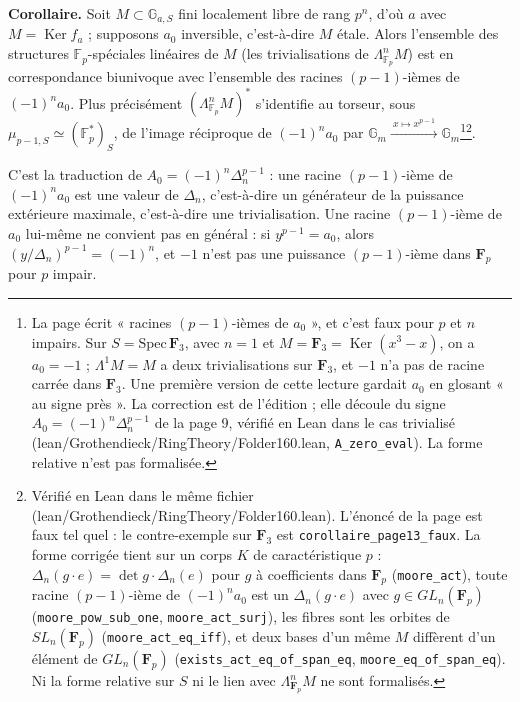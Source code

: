 \documentclass[11pt,a4paper]{article}
\begin{document}
\textbf{Corollaire.} Soit $M \subset \mathbb{G}_{a,S}$ fini localement libre
de rang $p^n$, d'où $a$ avec $M = \operatorname{Ker} f_a$ ; supposons $a_0$
inversible, c'est-à-dire $M$ étale. Alors l'ensemble des structures
$\mathbb{F}_p$-spéciales linéaires de $M$ (les trivialisations de
$\Lambda^n_{\mathbb{F}_p} M$) est en correspondance biunivoque avec
l'ensemble des racines $(p-1)$-ièmes de $(-1)^n a_0$. Plus précisément
$(\Lambda^n_{\mathbb{F}_p} M)^*$ s'identifie au torseur, sous
$\mu_{p-1,S} \simeq (\mathbb{F}_p^*)_S$, de l'image réciproque de
$(-1)^n a_0$ par
$\mathbb{G}_m \xrightarrow{\ x \mapsto x^{p-1}\ } \mathbb{G}_m$\footnote{La
page écrit « racines $(p-1)$-ièmes de $a_0$ », et c'est faux pour $p$ et $n$
impairs. Sur $S = \mathrm{Spec}\,\mathbf{F}_3$, avec $n = 1$ et
$M = \mathbf{F}_3 = \operatorname{Ker}(x^3 - x)$, on a $a_0 = -1$ ;
$\Lambda^1 M = M$ a deux trivialisations sur $\mathbf{F}_3$, et $-1$ n'a pas de
racine carrée dans $\mathbf{F}_3$. Une première version de cette lecture
gardait $a_0$ en glosant « au signe près ». La correction est de l'édition ;
elle découle du signe $A_0 = (-1)^n \Delta_n^{p-1}$ de la page 9, vérifié en
Lean dans le cas trivialisé (lean/Grothendieck/RingTheory/Folder160.lean,
\texttt{A\_zero\_eval}). La forme relative n'est pas formalisée.}\footnote{Vérifié en Lean dans le même fichier
(lean/Grothendieck/RingTheory/Folder160.lean). L'énoncé de la page est faux tel quel :
le contre-exemple sur $\mathbf{F}_3$ est \texttt{corollaire\_page13\_faux}.
La forme corrigée tient sur un corps $K$ de caractéristique $p$ :
$\Delta_n(g \cdot e) = \det g \cdot \Delta_n(e)$ pour $g$ à coefficients dans
$\mathbf{F}_p$ (\texttt{moore\_act}), toute racine $(p-1)$-ième de
$(-1)^n a_0$ est un $\Delta_n(g \cdot e)$ avec $g \in GL_n(\mathbf{F}_p)$
(\texttt{moore\_pow\_sub\_one}, \texttt{moore\_act\_surj}), les fibres sont
les orbites de $SL_n(\mathbf{F}_p)$ (\texttt{moore\_act\_eq\_iff}), et deux
bases d'un même $M$ diffèrent d'un élément de $GL_n(\mathbf{F}_p)$
(\texttt{exists\_act\_eq\_of\_span\_eq}, \texttt{moore\_eq\_of\_span\_eq}).
Ni la forme relative sur $S$ ni le lien avec $\Lambda^n_{\mathbf{F}_p} M$ ne
sont formalisés.}.

C'est la traduction de $A_0 = (-1)^n \Delta_n^{p-1}$ : une racine
$(p-1)$-ième de $(-1)^n a_0$ est une valeur de $\Delta_n$, c'est-à-dire un
générateur de la puissance extérieure maximale, c'est-à-dire une
trivialisation. Une racine $(p-1)$-ième de $a_0$ lui-même ne convient pas en
général : si $y^{p-1} = a_0$, alors $(y/\Delta_n)^{p-1} = (-1)^n$, et $-1$
n'est pas une puissance $(p-1)$-ième dans $\mathbf{F}_p$ pour $p$ impair.
\end{document}
